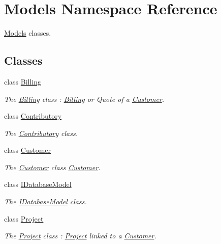 \hypertarget{namespaceModels}{\section{Models Namespace Reference}
\label{namespaceModels}
}


\hyperlink{namespaceModels}{Models} classes.  


\subsection*{Classes}
\begin{DoxyCompactItemize}
\item 
class \hyperlink{classModels_1_1Billing}{Billing}
\begin{DoxyCompactList}\small\item\em The \hyperlink{classModels_1_1Billing}{Billing} class \+: \hyperlink{classModels_1_1Billing}{Billing} or Quote of a \hyperlink{classModels_1_1Customer}{Customer}. \end{DoxyCompactList}\item 
class \hyperlink{classModels_1_1Contributory}{Contributory}
\begin{DoxyCompactList}\small\item\em The \hyperlink{classModels_1_1Contributory}{Contributory} class. \end{DoxyCompactList}\item 
class \hyperlink{classModels_1_1Customer}{Customer}
\begin{DoxyCompactList}\small\item\em The \hyperlink{classModels_1_1Customer}{Customer} class \hyperlink{classModels_1_1Customer}{Customer}. \end{DoxyCompactList}\item 
class \hyperlink{classModels_1_1IDatabaseModel}{I\+Database\+Model}
\begin{DoxyCompactList}\small\item\em The \hyperlink{classModels_1_1IDatabaseModel}{I\+Database\+Model} class. \end{DoxyCompactList}\item 
class \hyperlink{classModels_1_1Project}{Project}
\begin{DoxyCompactList}\small\item\em The \hyperlink{classModels_1_1Project}{Project} class \+: \hyperlink{classModels_1_1Project}{Project} linked to a \hyperlink{classModels_1_1Customer}{Customer}. \end{DoxyCompactList}\item 

\end{DoxyCompactItemize}
